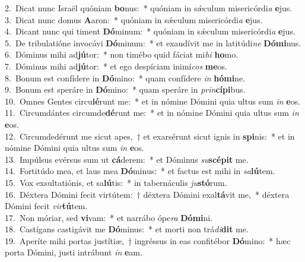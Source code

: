 {2.~}Dicat nunc Israël quóniam \textbf{bo}nus:~* quóniam in sǽculum misericórdi\textit{a} \textbf{e}jus.\\
{3.~}Dicat nunc domus \textbf{A}aron:~* quóniam in sǽculum misericórdi\textit{a} \textbf{e}jus.\\
{4.~}Dicant nunc qui timent \textbf{Dó}minum:~* quóniam in sǽculum misericórdi\textit{a} \textbf{e}jus.\\
{5.~}De tribulatióne invocávi \textbf{Dó}minum:~* et exaudívit me in latitúdi\textit{ne} \textbf{Dó}\textbf{mi}nus.\\
{6.~}Dóminus mihi ad\textbf{jú}tor:~* non timébo quid fáciat mi\textit{hi} \textbf{ho}mo.\\
{7.~}Dóminus mihi ad\textbf{jú}tor:~* et ego despíciam inimí\textit{cos} \textbf{me}os.\\
{8.~}Bonum est confídere in \textbf{Dó}mino:~* quam confídere \textit{in} \textbf{hó}\textbf{mi}ne.\\
{9.~}Bonum est speráre in \textbf{Dó}mino:~* quam speráre in \textit{prin}\textbf{cí}\textbf{pi}bus.\\
{10.~}Omnes Gentes circu\textbf{ié}runt me:~* et in nómine Dómini quia ultus sum \textit{in} \textbf{e}os.\\
{11.~}Circumdántes circumde\textbf{dé}runt me:~* et in nómine Dómini quia ultus sum \textit{in} \textbf{e}os.\\
{12.~}Circumdedérunt me sicut apes,~† et exarsérunt sicut ignis in \textbf{spi}nis:~* et in nómine Dómini quia ultus sum \textit{in} \textbf{e}os.\\
{13.~}Impúlsus evérsus sum ut \textbf{cá}derem:~* et Dóminus \textit{su}\textbf{scé}\textbf{pit} me.\\
{14.~}Fortitúdo mea, et laus mea \textbf{Dó}minus:~* et factus est mihi in \textit{sa}\textbf{lú}tem.\\
{15.~}Vox exsultatiónis, et sa\textbf{lú}tis:~* in tabernáculis \textit{ju}\textbf{stó}rum.\\
{16.~}Déxtera Dómini fecit virtútem:~† déxtera Dómini exal\textbf{tá}vit me,~* déxtera Dómini fecit \textit{vir}\textbf{tú}tem.\\
{17.~}Non móriar, sed \textbf{vi}vam:~* et narrábo ópe\textit{ra} \textbf{Dó}\textbf{mi}ni.\\
{18.~}Castígans castigávit me \textbf{Dó}minus:~* et morti non trá\textit{di}\textbf{dit} me.\\
{19.~}Aperíte mihi portas justítiæ,~† ingréssus in eas confitébor \textbf{Dó}mino:~* hæc porta Dómini, justi intrábunt \textit{in} \textbf{e}am.\\
